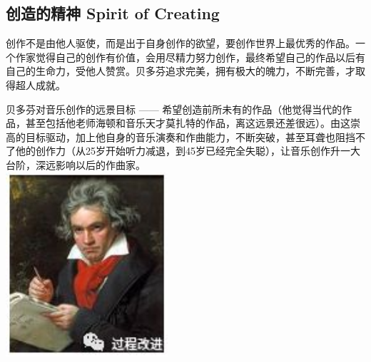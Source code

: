 \hypertarget{ux521bux9020ux7684ux7cbeux795e-spirit-of-creating}{%
\subsection{创造的精神 Spirit of
Creating}\label{ux521bux9020ux7684ux7cbeux795e-spirit-of-creating}}

创作不是由他人驱使，而是出于自身创作的欲望，要创作世界上最优秀的作品。一个作家觉得自己的创作有价值，会用尽精力努力创作，最终希望自己的作品以后有自己的生命力，受他人赞赏。贝多芬追求完美，拥有极大的魄力，不断完善，才取得超人成就。

贝多芬对音乐创作的远景目标 ------
希望创造前所未有的作品（他觉得当代的作品，甚至包括他老师海顿和音乐天才莫扎特的作品，离这远景还差很远）。由这崇高的目标驱动，加上他自身的音乐演奏和作曲能力，不断突破，甚至耳聋也阻挡不了他的创作力（从25岁开始听力减退，到45岁已经完全失聪），让音乐创作升一大台阶，深远影响以后的作曲家。\\

\includegraphics[width=6cm]{Bdf.png}

